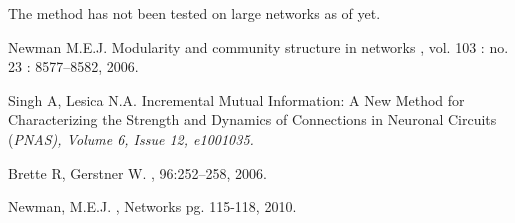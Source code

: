 \documentclass[a0,portrait, 18pt]{a0poster}
\newenvironment{textbox}
{\begin{lrbox}{\dummybox}\begin{minipage}{0.9\columnwidth}}
{\end{minipage}\end{lrbox}\raisebox{-\depth}{\psshadowbox[framesep=1em,framearc=0,shadow=false]{\usebox{\dummybox}}}\vspace{0.005\textheight}}
\begin{document}
\begin{center}
{\begin{textbox}
The method has not been tested on large networks as of yet.

\end{textbox}

\begin{textbox}
{\footnotesize
\begin{thebibliography}{10}

Newman M.E.J.
\newblock Modularity and community structure in networks
, vol. 103 : no. 23 : 8577--8582, 2006.

Singh A, Lesica N.A.
\newblock Incremental Mutual Information: A New Method for Characterizing the Strength and Dynamics of Connections in Neuronal Circuits
\newblock (\em PNAS), Volume 6, Issue 12, e1001035.

Brette R, Gerstner W.
, 96:252--258, 2006.

Newman, M.E.J.
, Networks pg. 115-118, 2010.


\end{thebibliography}
}
\end{textbox}
}%
\end{center}
\end{document}
